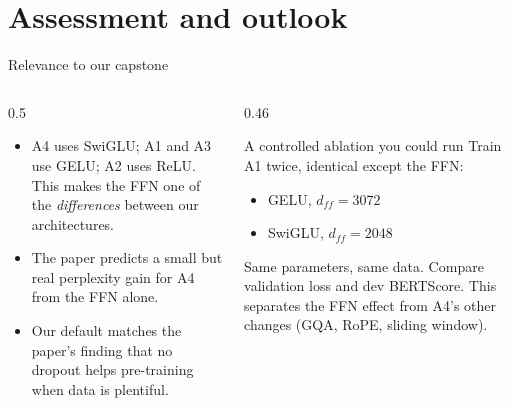 \documentclass[aspectratio=169,11pt]{beamer}
\begin{document}
\section{Assessment and outlook}

\begin{frame}{Relevance to our capstone}
  \begin{columns}[T]
    \begin{column}{0.5\textwidth}
      \small
      \begin{itemize}
        \item A4 uses SwiGLU; A1 and A3 use GELU; A2 uses ReLU. This makes the FFN one of the \emph{differences} between our architectures.
        \item The paper predicts a small but real perplexity gain for A4 from the FFN alone.
        \item Our default  matches the paper's finding that no dropout helps pre-training when data is plentiful.
      \end{itemize}
    \end{column}
    \begin{column}{0.46\textwidth}
      \begin{block}{A controlled ablation you could run}
        \small
        Train A1 twice, identical except the FFN:
        \begin{itemize}
          \item GELU, $d_{ff}=3072$
          \item SwiGLU, $d_{ff}=2048$
        \end{itemize}
        Same parameters, same data. Compare validation loss and dev BERTScore.
        This separates the FFN effect from A4's other changes (GQA, RoPE, sliding window).
      \end{block}
    \end{column}
  \end{columns}
\end{frame}
\end{document}
